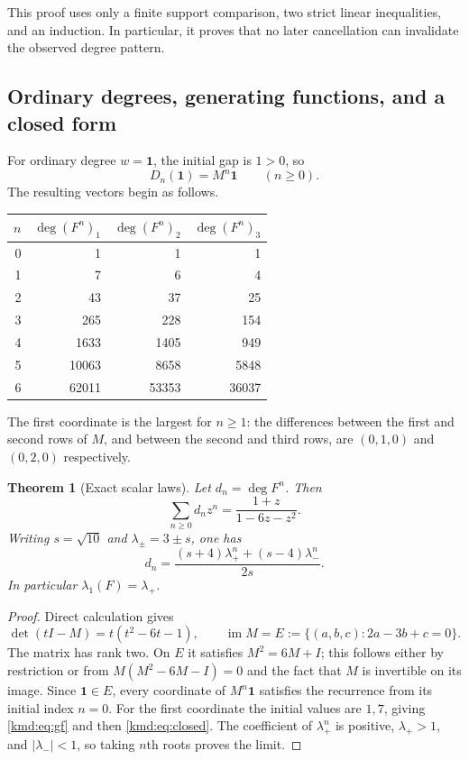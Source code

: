 \documentclass[11pt,a4paper]{article}
\numberwithin{equation}{section}
\newtheorem{theorem}{Theorem}[section]
\theoremstyle{definition}
\theoremstyle{remark}
\newcommand{\one}{\mathbf 1}
\newcommand{\dd}{\operatorname{deg}}
\begin{document}
This proof uses only a finite support comparison, two strict linear
inequalities, and an induction. In particular, it proves that no
later cancellation can invalidate the observed degree pattern.

\subsection{Ordinary degrees, generating functions, and a closed form}
For ordinary degree $w=\one$, the initial gap is $1>0$, so
\begin{equation}
 D_n(\one)=M^n\one\qquad(n\ge0).
 \label{kmd:eq:ordinary-matrix}
\end{equation}
The resulting vectors begin as follows.
\begin{center}
\begin{tabular}{@{}rrrr@{}}
\toprule
$n$ & $\dd(F^n)_1$ & $\dd(F^n)_2$ & $\dd(F^n)_3$\\
\midrule
0&1&1&1\\
1&7&6&4\\
2&43&37&25\\
3&265&228&154\\
4&1633&1405&949\\
5&10063&8658&5848\\
6&62011&53353&36037\\
\bottomrule
\end{tabular}
\end{center}
The first coordinate is the largest for $n\ge1$: the differences
between the first and second rows of $M$, and between the second
and third rows, are $(0,1,0)$ and $(0,2,0)$ respectively.

\begin{theorem}[Exact scalar laws]\label{kmd:thm:recurrence}
Let $d_n=\dd F^n$. Then
\begin{equation}
 \sum_{n\ge0}d_nz^n=\frac{1+z}{1-6z-z^2}.
 \label{kmd:eq:gf}
\end{equation}
Writing $s=\sqrt{10}$ and $\lambda_\pm=3\pm s$, one has
\begin{equation}
 d_n=\frac{(s+4)\lambda_+^n+(s-4)\lambda_-^n}{2s}.
 \label{kmd:eq:closed}
\end{equation}
In particular $\lambda_1(F)=\lambda_+$.
\end{theorem}
\begin{proof}
Direct calculation gives
\[
 \det(tI-M)=t(t^2-6t-1),\qquad
 \operatorname{im}M=E:=\{(a,b,c):2a-3b+c=0\}.
\]
The matrix has rank two. On $E$ it satisfies $M^2=6M+I$; this follows
either by restriction or from $M(M^2-6M-I)=0$ and the fact that
$M$ is invertible on its image. Since $\one\in E$, every coordinate
of $M^n\one$ satisfies the recurrence from its initial index $n=0$.
For the first coordinate the initial values are $1,7$, giving
\eqref{kmd:eq:gf} and then \eqref{kmd:eq:closed}. The coefficient of
$\lambda_+^n$ is positive, $\lambda_+>1$, and $|\lambda_-|<1$, so
taking $n$th roots proves the limit.
\end{proof}
\end{document}
